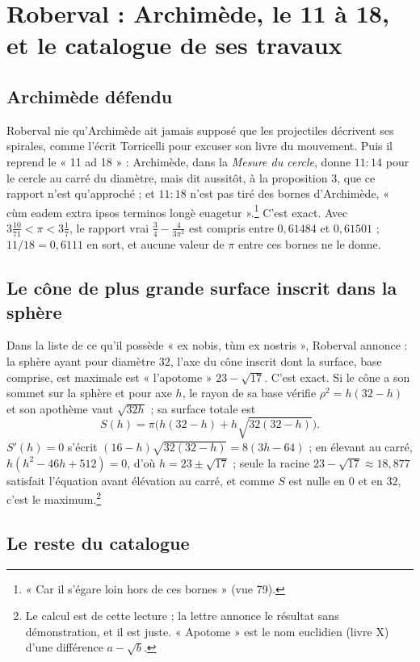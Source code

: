 \documentclass[11pt,a4paper]{article}
\begin{document}
\section*{Roberval : Archimède, le 11 à 18, et le catalogue de ses travaux}

\subsection*{Archimède défendu}

Roberval nie qu'Archimède ait jamais supposé que les projectiles décrivent ses
spirales, comme l'écrit Torricelli pour excuser son livre du mouvement. Puis il
reprend le « 11 ad 18 » : Archimède, dans la \emph{Mesure du cercle}, donne
$11:14$ pour le cercle au carré du diamètre, mais dit aussitôt, à la proposition
3, que ce rapport n'est qu'approché ; et $11:18$ n'est pas tiré des bornes
d'Archimède, « cùm eadem extra ipsos terminos longè euagetur ».\footnote{« Car il
s'égare loin hors de ces bornes » (vue 79).} C'est exact. Avec $3\frac{10}{71} <
\pi < 3\frac17$, le rapport vrai $\frac34-\frac{4}{3\pi^2}$ est compris entre
$0{,}61484$ et $0{,}61501$ ; $11/18 = 0{,}6111$ en sort, et aucune valeur de $\pi$
entre ces bornes ne le donne.

\subsection*{Le cône de plus grande surface inscrit dans la sphère}

Dans la liste de ce qu'il possède « ex nobis, tùm ex nostris », Roberval
annonce : la sphère ayant pour diamètre $32$, l'axe du cône inscrit dont la
surface, base comprise, est maximale est « l'apotome » $23-\sqrt{17}$. C'est
exact. Si le cône a son sommet sur la sphère et pour axe $h$, le rayon de sa base
vérifie $\rho^2 = h(32-h)$ et son apothème vaut $\sqrt{32h}$ ; sa surface totale
est
\[
S(h) = \pi\bigl(h(32-h) + h\sqrt{32(32-h)}\bigr).
\]
$S'(h)=0$ s'écrit $(16-h)\sqrt{32(32-h)} = 8(3h-64)$ ; en élevant au carré,
$h(h^2-46h+512) = 0$, d'où $h = 23\pm\sqrt{17}$ ; seule la racine $23-\sqrt{17}
\approx 18{,}877$ satisfait l'équation avant élévation au carré, et comme $S$ est
nulle en $0$ et en $32$, c'est le maximum.\footnote{Le calcul est de cette
lecture ; la lettre annonce le résultat sans démonstration, et il est juste.
« Apotome » est le nom euclidien (livre X) d'une différence $a-\sqrt b$.}

\subsection*{Le reste du catalogue}
\end{document}
